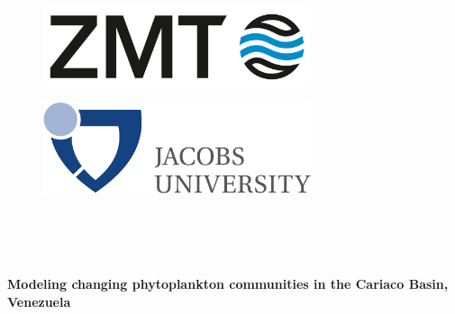 \begin{titlepage}
\begin{center}

\begin{figure}[ht]
\begin{minipage}[b]{0.5\linewidth}
\centering
\includegraphics[width=0.7\textwidth]{./0-titel/ZMT_Logo_BILDMARKE_rgb_ENG.png}\\ 
\end{minipage}
\hspace{0.5cm}
\begin{minipage}[b]{0.5\linewidth}
\centering
\includegraphics[width=0.7\textwidth]{./0-titel/jacobs_big.pdf}\\
\end{minipage}
\end{figure}

\vspace{1cm}

\\[1.cm]

\\[1.5cm]

\vspace{2cm}

\\[0.5 cm]


{ \Huge \bfseries Modeling changing phytoplankton communities in the Cariaco Basin, Venezuela}\\[0.4cm]



\end{center}
\end{titlepage}
